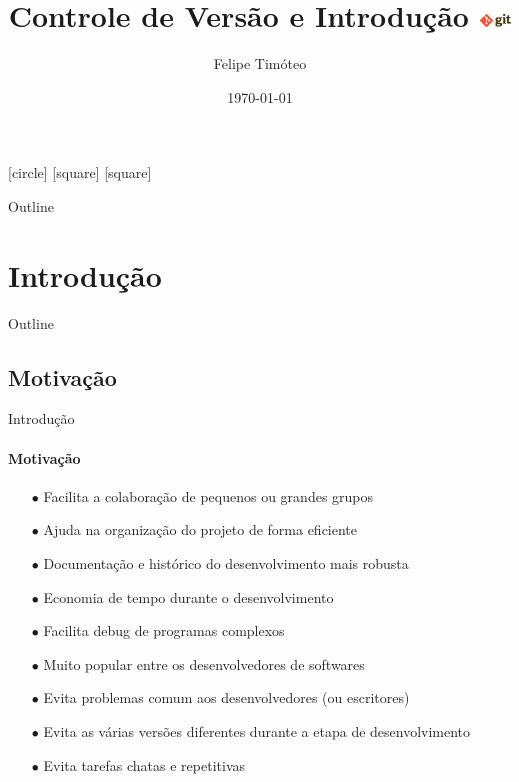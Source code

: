 \documentclass[xcolor=dvipsnames,t]{beamer}
\title[Git]{Controle de Versão e Introdução \includegraphics[height=0.35cm]{figures/gitlogo.png}}
\author[Felipe]{Felipe Timóteo}
\institute{GISIS \& DOT UFF }
\date{\today}
\begin{document}
\begin{frame}
  \titlepage
\end{frame}

[circle]
[square]
[square]
\begin{frame}{Outline}
	\tiny
	\tableofcontents[pausesections]
\end{frame}

\section{Introdução}
\begin{frame}{Outline}
\tiny
\tableofcontents[current]
\end{frame}

\subsection{Motivação}
\begin{frame}{Introdução}
\framesubtitle{Motivação}

\begin{itemize}
	\item[$ \bullet $] Facilita a colaboração de pequenos ou grandes grupos
	\item[$ \bullet $] Ajuda na organização do projeto de forma eficiente
	\item[$ \bullet $] Documentação e histórico do desenvolvimento mais robusta
	\item[$ \bullet $] Economia de tempo durante o desenvolvimento
	\item[$ \bullet $] Facilita debug de programas complexos
	\item[$ \bullet $] Muito popular entre os desenvolvedores de softwares
	\item[$ \bullet $] Evita problemas comum aos desenvolvedores (ou escritores)
	\item[$ \bullet $] Evita as várias versões diferentes durante a etapa de desenvolvimento
	\item[$ \bullet $] Evita tarefas chatas e repetitivas
\end{itemize}
\end{frame}
\end{document}
